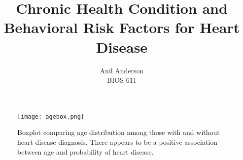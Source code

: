 \documentclass[12pt]{article}
\begin{document}
 
\title{Chronic Health Condition and Behavioral Risk Factors for Heart Disease}
\author{Anil Anderson\\
BIOS 611}
 
\maketitle

\begin{figure}[htbp]
\centering
\texttt{[image: agebox.png]}
\caption{Boxplot comparing age distribution among those with and without heart disease diagnosis. There appears to be a positive association between age and probability of heart disease.}
\end{figure}
\end{document}

